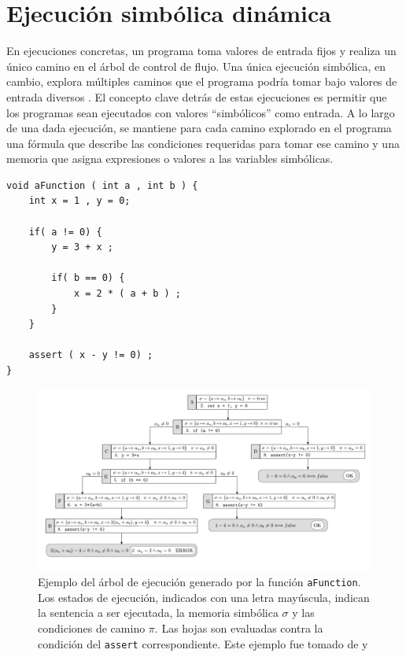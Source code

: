 \section{Ejecución simbólica dinámica}
En ejecuciones concretas, un programa toma valores de entrada fijos y realiza un único camino en el árbol de control de flujo.
Una única ejecución simbólica, en cambio, explora múltiples caminos que el programa podría tomar bajo valores de entrada diversos \cite{survey-on-symbolic-execution} \cite{symbolic-execution-three-decades-later}.
El concepto clave detrás de estas ejecuciones es permitir que los programas sean ejecutados con valores ``simbólicos'' como entrada.
A lo largo de una dada ejecución, se mantiene para cada camino explorado en el programa una fórmula que describe las condiciones requeridas para tomar ese camino y una memoria que asigna expresiones o valores a las variables simbólicas.
\begin{lstlisting}[caption={Ejemplo de código para ilustrar los árboles de ejecución simbólica},label={code:symb-exec-example}]
void aFunction ( int a , int b ) {
    int x = 1 , y = 0;
    
    if( a != 0) {
        y = 3 + x ;
    
        if( b == 0) {
            x = 2 * ( a + b ) ;
        }
    }
    
    assert ( x - y != 0) ;
}
\end{lstlisting}
\begin{figure}
    \centering
    \includegraphics[width=\textwidth]{figs/symbolic-execution-paths.png}
    \caption{Ejemplo del árbol de ejecución generado por la función \texttt{aFunction}.
        Los estados de ejecución, indicados con una letra mayúscula, indican la sentencia a ser ejecutada, la memoria simbólica $\sigma$ y las condiciones de camino $\pi$.
        Las hojas son evaluadas contra la condición del \texttt{assert} correspondiente. Este ejemplo fue tomado de \cite{vera-tesis} y \cite{survey-on-symbolic-execution}}
    \label{fig:symb-tree-example}
\end{figure}

